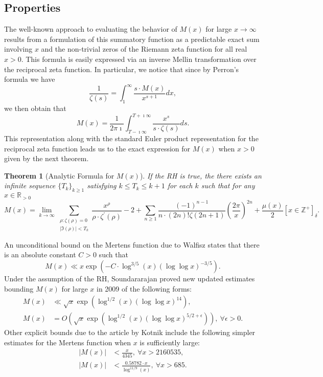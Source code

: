 \documentclass[11pt,reqno,a4letter]{article}
\numberwithin{figure}{section}
\numberwithin{table}{section}
\newcommand{\Iverson}[1]{\ensuremath{\left[#1\right]_{\delta}}}
\theoremstyle{plain}
\newtheorem{theorem}{Theorem}
\numberwithin{theorem}{section}
\theoremstyle{definition}
\begin{document}
\subsection{Properties} 

The well-known approach to evaluating the behavior of $M(x)$ for large 
$x \rightarrow \infty$ results from a formulation of this summatory 
function as a predictable exact sum involving $x$ and the non-trivial 
zeros of the Riemann zeta function for all real $x > 0$. 
This formula is easily expressed via an inverse Mellin transformation 
over the reciprocal zeta function. In particular, 
we notice that since by Perron's formula we have 
\[
\frac{1}{\zeta(s)} = \int_1^{\infty} \frac{s \cdot M(x)}{x^{s+1}} dx, 
\]
we then obtain that 
\[
M(x) = \frac{1}{2\pi\imath} \int_{T-\imath\infty}^{T+\imath\infty} 
     \frac{x^s}{s \cdot \zeta(s)} ds. 
\] 
This representation along with the standard Euler product 
representation for the reciprocal zeta function leads us to the 
exact expression for $M(x)$ when $x > 0$ given by the next theorem. 

\begin{theorem}[Analytic Formula for $M(x)$] 
\label{theorem_MxMellinTransformInvFormula} 
If the RH is true, the there exists an infinite sequence 
$\{T_k\}_{k \geq 1}$ satisfying $k \leq T_k \leq k+1$ for each $k$ 
such that for any $x \in \mathbb{R}_{>0}$ 
\[
M(x) = \lim_{k \rightarrow \infty} 
     \sum_{\substack{\rho: \zeta(\rho) = 0 \\ |\Im(\rho)| < T_k}} 
     \frac{x^{\rho}}{\rho \cdot \zeta^{\prime}(\rho)} - 2 + 
     \sum_{n \geq 1} \frac{(-1)^{n-1}}{n \cdot (2n)! \zeta(2n+1)} 
     \left(\frac{2\pi}{x}\right)^{2n} + 
     \frac{\mu(x)}{2} \Iverson{x \in \mathbb{Z}^{+}}. 
\] 
\end{theorem} 

An unconditional bound on the Mertens function due to Walfisz 
\cite{see Ivic} states that there is an absolute constant $C > 0$ such that 
$$M(x) \ll x \exp\left(-C \cdot \log^{3/5}(x) 
  (\log\log x)^{-3/5}\right).$$ 
Under the assumption of the RH, Soundararajan proved new updated estimates 
bounding $M(x)$ for large $x$ in 2009 of the following forms: 
\begin{align*} 
M(x) & \ll \sqrt{x} \exp\left(\log^{1/2}(x) (\log\log x)^{14}\right), \\ 
M(x) & = O\left(\sqrt{x} \exp\left( 
     \log^{1/2}(x) (\log\log x)^{5/2+\epsilon}\right)\right),\ 
     \forall \epsilon > 0. 
\end{align*} 
Other explicit bounds due to the article by Kotnik include the following 
simpler estimates for the Mertens function when $x$ is sufficiently 
large: 
\begin{align*} 
|M(x)| & < \frac{x}{4345},\ \forall x > 2160535, \\ 
|M(x)| & < \frac{0.58782 \cdot x}{\log^{11/9}(x)},\ \forall x > 685. 
\end{align*} 
\end{document}
